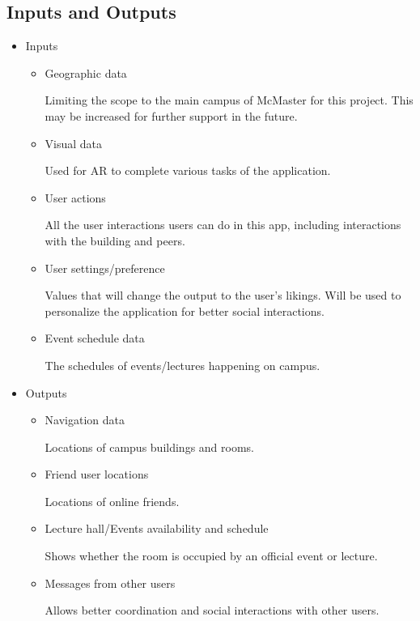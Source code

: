\documentclass{article}
\begin{document}
\subsection{Inputs and Outputs}
\begin{itemize}
    \item Inputs
    \begin{itemize}
        \item Geographic data

        \quad Limiting the scope to the main campus of McMaster for this project. This may be increased for further support in the future.

        \item Visual data

        \quad Used for AR to complete various tasks of the application.
        
        \item User actions 

        \quad All the user interactions users can do in this app, including interactions with the building and peers.

        \item User settings/preference

        \quad Values that will change the output to the user's likings. Will be used to personalize the application for better social interactions.
        
        \item Event schedule data 

        \quad The schedules of events/lectures happening on campus.

    \end{itemize}
    \item Outputs
    \begin{itemize}
        \item Navigation data
        
        \quad Locations of campus buildings and rooms.
        
        \item Friend user locations

        \quad Locations of online friends.
        
        \item Lecture hall/Events availability and schedule

        \quad Shows whether the room is occupied by an official event or lecture.
        
        \item Messages from other users

        \quad Allows better coordination and social interactions with other users.
    \end{itemize}
\end{itemize}
\end{document}
